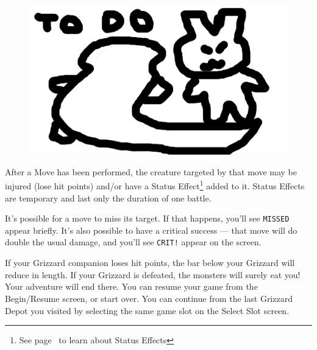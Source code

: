 \documentclass[10pt,twocolumn,openany,article]{memoir}
\begin{document}
\begin{figure}[b]
  \begin{center}
    \includegraphics[width=2\columnwidth,height=\columnwidth]{../Manual/GrizzardCombat.png}
  \end{center}
\end{figure}

After a Move has been performed,  the creature targeted by that move may
be injured  (lose hit points)  and/or have a  Status Effect\footnote{See
  page~\pageref{sec:StatusEffects} to learn  about Status Effects} added
to  it. Status  Effects  are temporary  and last  only  the duration  of
one battle.

It's possible for a move to miss its target. If that happens, you'll see
\texttt{MISSED} appear  briefly. It's also  possible to have  a critical
success ---  that move will do  double the usual damage,  and you'll see
\texttt{CRIT!} appear on the screen.

If your Grizzard companion loses hit points, the bar below your Grizzard
will reduce in  length. If your Grizzard is defeated,  the monsters will
surely eat you! Your adventure will end there. \ifdefined\NOSAVE You can
resume your game from the Begin/Resume  screen, or start over. \else You
can continue from  the last Grizzard Depot you visited  by selecting the
same game slot on the Select Slot screen. \fi
\end{document}
